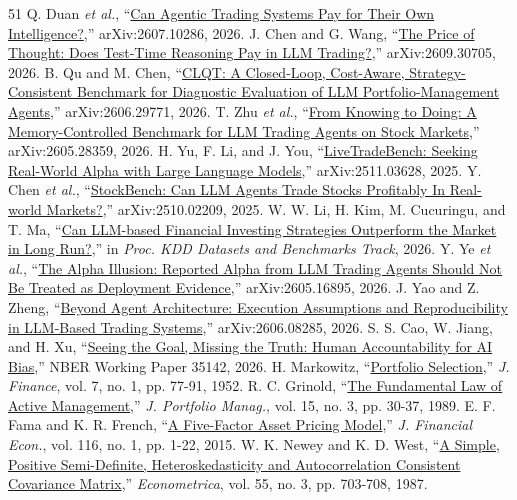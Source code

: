 \documentclass[conference]{IEEEtran}
\begin{document}
{\begin{thebibliography}{51}
 Q. Duan \textit{et al.}, ``\href{https://arxiv.org/abs/2607.10286}{Can Agentic Trading Systems Pay for Their Own Intelligence?},'' arXiv:2607.10286, 2026.
 J. Chen and G. Wang, ``\href{https://arxiv.org/abs/2609.30705}{The Price of Thought: Does Test-Time Reasoning Pay in LLM Trading?},'' arXiv:2609.30705, 2026.
 B. Qu and M. Chen, ``\href{https://arxiv.org/abs/2606.29771}{CLQT: A Closed-Loop, Cost-Aware, Strategy-Consistent Benchmark for Diagnostic Evaluation of LLM Portfolio-Management Agents},'' arXiv:2606.29771, 2026.
 T. Zhu \textit{et al.}, ``\href{https://arxiv.org/abs/2605.28359}{From Knowing to Doing: A Memory-Controlled Benchmark for LLM Trading Agents on Stock Markets},'' arXiv:2605.28359, 2026.
 H. Yu, F. Li, and J. You, ``\href{https://arxiv.org/abs/2511.03628}{LiveTradeBench: Seeking Real-World Alpha with Large Language Models},'' arXiv:2511.03628, 2025.
 Y. Chen \textit{et al.}, ``\href{https://arxiv.org/abs/2510.02209}{StockBench: Can LLM Agents Trade Stocks Profitably In Real-world Markets?},'' arXiv:2510.02209, 2025.
 W. W. Li, H. Kim, M. Cucuringu, and T. Ma, ``\href{https://arxiv.org/abs/2505.07078}{Can LLM-based Financial Investing Strategies Outperform the Market in Long Run?},'' in \textit{Proc. KDD Datasets and Benchmarks Track}, 2026.
 Y. Ye \textit{et al.}, ``\href{https://arxiv.org/abs/2605.16895}{The Alpha Illusion: Reported Alpha from LLM Trading Agents Should Not Be Treated as Deployment Evidence},'' arXiv:2605.16895, 2026.
 J. Yao and Z. Zheng, ``\href{https://arxiv.org/abs/2606.08285}{Beyond Agent Architecture: Execution Assumptions and Reproducibility in LLM-Based Trading Systems},'' arXiv:2606.08285, 2026.
 S. S. Cao, W. Jiang, and H. Xu, ``\href{https://www.nber.org/papers/w35142}{Seeing the Goal, Missing the Truth: Human Accountability for AI Bias},'' NBER Working Paper 35142, 2026.
 H. Markowitz, ``\href{https://doi.org/10.1111/j.1540-6261.1952.tb01525.x}{Portfolio Selection},'' \textit{J. Finance}, vol. 7, no. 1, pp. 77-91, 1952.
 R. C. Grinold, ``\href{https://doi.org/10.3905/jpm.1989.409211}{The Fundamental Law of Active Management},'' \textit{J. Portfolio Manag.}, vol. 15, no. 3, pp. 30-37, 1989.
 E. F. Fama and K. R. French, ``\href{https://doi.org/10.1016/j.jfineco.2014.10.010}{A Five-Factor Asset Pricing Model},'' \textit{J. Financial Econ.}, vol. 116, no. 1, pp. 1-22, 2015.
 W. K. Newey and K. D. West, ``\href{https://doi.org/10.2307/1913610}{A Simple, Positive Semi-Definite, Heteroskedasticity and Autocorrelation Consistent Covariance Matrix},'' \textit{Econometrica}, vol. 55, no. 3, pp. 703-708, 1987.

\end{thebibliography}}
\end{document}
